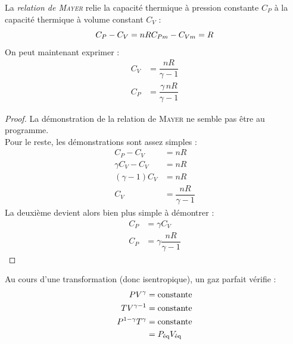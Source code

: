 \documentclass[11pt,a4paper,fleqn,pdftex]{report}
\begin{document}
\begin{theorem}
   La \emph{relation de \textsc{Mayer}} relie la capacité thermique à pression constante $C_P$ à la capacité thermique à volume constant $C_V$ : 
\begin{equation}
C_P - C_V = nR \\ C_{Pm} - C_{Vm} = R
\end{equation}
On peut maintenant exprimer : 
\begin{subequations}
   \begin{align}
      C_V &= \dfrac{n R}{\gamma - 1} \\
      C_P &= \dfrac{\gamma\, nR}{\gamma - 1}
   \end{align}
\end{subequations}
\end{theorem}
\begin{proof}
   La démonstration de la relation de \textsc{Mayer} ne semble pas être au programme.\\
   Pour le reste, les démonstrations sont assez simples : 
   \begin{align*}
      C_P - C_V &= nR \\
      \gamma C_V - C_V  &= nR \\
      (\gamma - 1) C_V &= nR \\
      C_V &= \dfrac{nR}{\gamma - 1}
   \end{align*}
   La deuxième devient alors bien plus simple à démontrer : 
   \begin{align*}
      C_P &= \gamma C_V \\
      C_P &= \gamma \dfrac{nR}{\gamma - 1}
   \end{align*}
\end{proof}
%
\begin{itheorem}
   Au cours d'une transformation  (donc isentropique), un gaz parfait vérifie : 
   \begin{subequations}
      \begin{align}
         PV^\gamma &= \text{constante}\\
         TV^{\gamma - 1} &= \text{constante}\\
         P^{1-\gamma}T^\gamma &= \text{constante}\label{eq:Laplace3}\\
            &= P_\text{éq}V_\text{éq}\notag
      \end{align}
   \end{subequations}
\end{itheorem}
\end{document}

